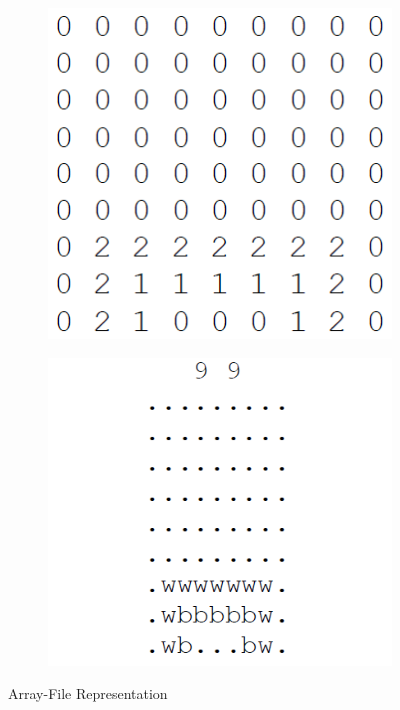\documentclass{l3proj}
\begin{document}
\begin{figure}[H]
	\centering
	\begin{subfigure}[b]{0.4\textwidth}
		\includegraphics[width=\textwidth]{Images/S33Board_Rep_Example_text}
	\end{subfigure}\hfill
	\begin{subfigure}[b]{0.4\textwidth}
		\includegraphics[width=\textwidth]{Images/S33Board_Rep_Example_file}
	\end{subfigure}\hfill
\caption{Array-File Representation}
\label{board_file_representation}
\end{figure}
\end{document}
